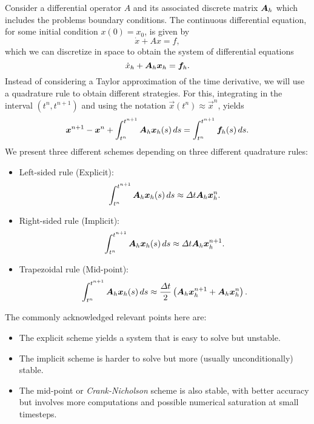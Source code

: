 Consider a differential operator $A$ and its associated discrete matrix $\mat A_h$ which includes the problems boundary conditions. The continuous differential equation, for some initial condition $x(0) = x_0$, is given by 
\begin{equation}
    \dot x + A x = f,
\end{equation}
which we can discretize in space to obtain the system of differential equations
\begin{equation}
    \dot x_h + \mat A_h \vec x_h = \vec f_h.
\end{equation}
Instead of considering a Taylor approximation of the time derivative, we will use a quadrature rule to obtain different strategies. For this, integrating in the interval $(t^n, t^{n+1})$ and using the notation $\vec x(t^n) \approx \vec x^{n}$, yields
\begin{equation}
    \vec x^{n+1} - \vec x^n + \int_{t^n}^{t^{n+1}} \mat A_h \vec x_h(s) \,ds = \int_{t^n}^{t^{n+1}} \vec f_h(s)\,ds.
\end{equation}
We present three different schemes depending on three different quadrature rules: 
\begin{itemize}
    \item Left-sided rule (Explicit):
    \begin{equation}
        \int_{t^n}^{t^{n+1}} \mat A_h \vec x_h(s)\,ds \approx \Delta t \mat A_h\vec x_h^n.
    \end{equation}
    \item Right-sided rule (Implicit): 
    \begin{equation}
        \int_{t^n}^{t^{n+1}} \mat A_h \vec x_h(s)\,ds \approx \Delta t\mat A_h\vec x_h^{n+1}.
    \end{equation}
    \item Trapezoidal rule (Mid-point): 
    \begin{equation}
        \int_{t^n}^{t^{n+1}} \mat A_h \vec x_h(s)\,ds \approx \frac{\Delta t}{2}\left(\mat A_h\vec x_h^{n+1}+ \mat A_h \vec x_h^n\right).
    \end{equation}
    \end{itemize}
    The commonly acknowledged relevant points here are: 
    \begin{itemize}
        \item The explicit scheme yields a system that is easy to solve but unstable.
        \item The implicit scheme is harder to solve but more (usually unconditionally) stable.
        \item The mid-point or \emph{Crank-Nicholson} scheme is also stable, with better accuracy but involves more computations and possible numerical saturation at small timesteps.
    \end{itemize}
